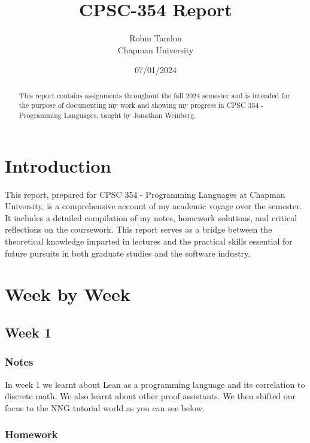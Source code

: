 \documentclass{article}
\title{CPSC-354 Report}
\author{Rohm Tandon  \\ Chapman University}
\date{07/01/2024}
\theoremstyle{theorem}
\theoremstyle{definition}
\theoremstyle{remark}
\begin{document}
\maketitle 

\begin{abstract}
This report contains assignments throughout the fall 2024 semester and is intended for the purpose of documenting my work and showing my progress in CPSC 354 - Programming Languages, taught by Jonathan Weinberg.
\end{abstract}

\setcounter{tocdepth}{3}
\tableofcontents

\section{Introduction}\label{intro}

This report, prepared for CPSC 354 - Programming Languages at Chapman University, is a comprehensive account of my academic voyage over the semester. It includes a detailed compilation of my notes, homework solutions, and critical reflections on the coursework. This report serves as a bridge between the theoretical knowledge imparted in lectures and the practical skills essential for future pursuits in both graduate studies and the software industry.

\section{Week by Week}\label{homework}

\subsection{Week 1}

\subsubsection*{Notes}

In week 1 we learnt about Lean as a programming language and its correlation to discrete math. We also learnt about other proof assistants. We then shifted our focus to the NNG tutorial world as you can see below.

\subsubsection*{Homework}
\end{document}
